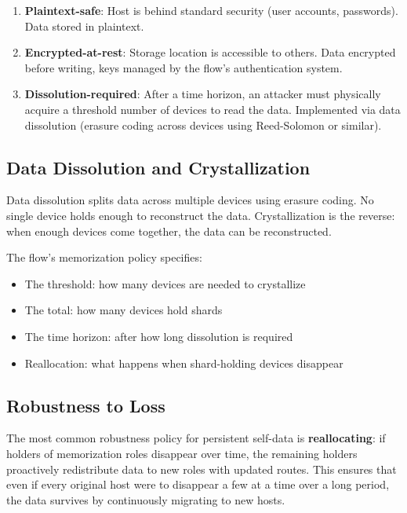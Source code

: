 \documentclass[11pt, letterpaper]{article}
\begin{document}
\begin{enumerate}[leftmargin=2em]
  \item \textbf{Plaintext-safe}: Host is behind standard security (user accounts,
    passwords). Data stored in plaintext.
  \item \textbf{Encrypted-at-rest}: Storage location is accessible to others. Data
    encrypted before writing, keys managed by the flow's authentication system.
  \item \textbf{Dissolution-required}: After a time horizon, an attacker must
    physically acquire a threshold number of devices to read the data. Implemented
    via data dissolution (erasure coding across devices using Reed-Solomon or similar).
\end{enumerate}

\subsection{Data Dissolution and Crystallization}

Data dissolution splits data across multiple devices using erasure coding. No single
device holds enough to reconstruct the data. Crystallization is the reverse: when
enough devices come together, the data can be reconstructed.

The flow's memorization policy specifies:
\begin{itemize}[leftmargin=2em]
  \item The threshold: how many devices are needed to crystallize
  \item The total: how many devices hold shards
  \item The time horizon: after how long dissolution is required
  \item Reallocation: what happens when shard-holding devices disappear
\end{itemize}

\subsection{Robustness to Loss}

The most common robustness policy for persistent self-data is \textbf{reallocating}:
if holders of memorization roles disappear over time, the remaining holders proactively
redistribute data to new roles with updated routes. This ensures that even if every
original host were to disappear a few at a time over a long period, the data survives
by continuously migrating to new hosts.
\end{document}
